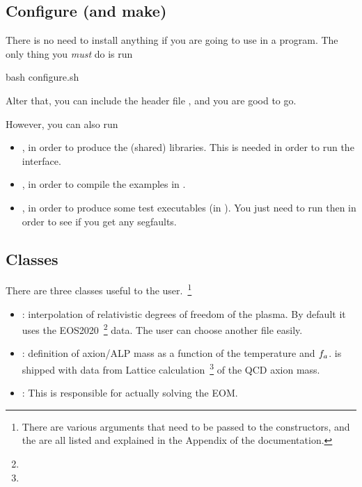 \documentclass[10pt,utf8,compress,xcolor=dvipsnames]{beamer}
\begin{document}
\subsection{Configure (and make)}
\begin{frame}[fragile]{\insertsubsectionhead}
	There is no need to install anything if you are going to use \mimes in a \CPP program. The only thing you {\em must} do is run 
	\begin{bash}
		bash configure.sh
	\end{bash}
	Alter that, you can include the header file , and you are good to go.
	
	However, you can also run 
	\begin{itemize}
		\item {}, in order to produce the (shared) libraries. This is needed in order to run the \PY interface. 
		\item {}, in order to compile the examples in .
		\item {}, in order to produce some test executables  (in ). You just need to run then in order to see if you get any segfaults.
	\end{itemize}
\end{frame}


\subsection{Classes}
\begin{frame}[fragile]{\insertsubsectionhead}
	There are three classes useful to the user.~\footnote{\fontF There are various arguments that need to be passed to the constructors, and the are all listed and explained in the Appendix of the documentation.}\pause
	\begin{itemize}
		\item {}: interpolation of relativistic degrees of freedom of the plasma. By default it uses the EOS2020~\footnote{\fontF 
		} data. The user can choose another file easily.
		\pause
		\item {}: definition of axion/ALP mass as a function of the temperature and $f_{a}{}$. \mimes is shipped with data from Lattice calculation~\footnote{\fontF {}} of the QCD axion mass.
		\pause
		\item {}: This is responsible for actually solving the EOM.
	\end{itemize}
	
	
\end{frame}
\end{document}

